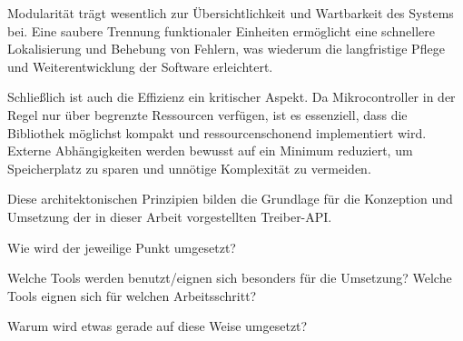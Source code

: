 Modularität trägt wesentlich zur Übersichtlichkeit und Wartbarkeit des Systems bei. 
Eine saubere Trennung funktionaler Einheiten ermöglicht eine schnellere Lokalisierung und Behebung von Fehlern, was wiederum die langfristige Pflege und Weiterentwicklung der Software erleichtert.

Schließlich ist auch die Effizienz ein kritischer Aspekt.
Da Mikrocontroller in der Regel nur über begrenzte Ressourcen verfügen, ist es essenziell, dass die Bibliothek möglichst kompakt und ressourcenschonend implementiert wird. 
Externe Abhängigkeiten werden bewusst auf ein Minimum reduziert, um Speicherplatz zu sparen und unnötige Komplexität zu vermeiden.

Diese architektonischen Prinzipien bilden die Grundlage für die Konzeption und Umsetzung der in dieser Arbeit vorgestellten Treiber-API.

Wie wird der jeweilige Punkt umgesetzt?

Welche Tools werden benutzt/eignen sich besonders für die Umsetzung?
Welche Tools eignen sich für welchen Arbeitsschritt?

Warum wird etwas gerade auf diese Weise umgesetzt?





























